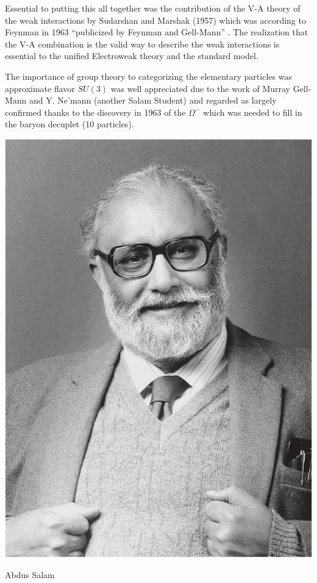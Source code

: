 \documentclass[preprintnumbers,12pt]{revtex4-2}
\begin{document}
Essential to putting this all together was the contribution of the V-A theory of the weak
interactions by Sudarshan and Marshak (1957) which was according to Feynman in 1963 ``publicized by
Feynman and Gell-Mann'' \cite{gmf;1958}. The realization that the V-A combination is
the valid way to describe the weak interactions is essential to the
unified Electroweak theory and the standard model.

The importance of group theory to categorizing the elementary
particles was approximate flavor $SU(3)$ was well appreciated due to
the work of Murray Gell-Mann \cite{mg;1962} and Y. Ne'mann
\cite{yn;1961} (another Salam Student) and regarded as largely
confirmed thanks to the discovery in 1963 of the $\Omega^{-}$ which
was needed to fill in the baryon decuplet (10 particles).

\begin{center}
  \includegraphics[scale=0.5]{salam.jpg}

  Abdus Salam
\end{center}
\end{document}
